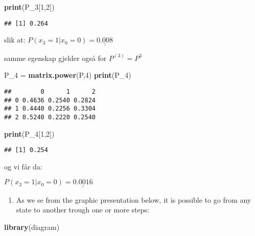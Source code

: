 \documentclass[]{article}
\newenvironment{Shaded}{\begin{snugshade}}{\end{snugshade}}
\newcommand{\DecValTok}[1]{\textcolor[rgb]{0.00,0.00,0.81}{#1}}
\newcommand{\KeywordTok}[1]{\textcolor[rgb]{0.13,0.29,0.53}{\textbf{#1}}}
\newcommand{\NormalTok}[1]{#1}
\newcommand{\StringTok}[1]{\textcolor[rgb]{0.31,0.60,0.02}{#1}}
\providecommand{\tightlist}{%
  \setlength{\itemsep}{0pt}\setlength{\parskip}{0pt}}
\begin{document}
\begin{Shaded}
\begin{Highlighting}[]
\KeywordTok{print}\NormalTok{(P_}\DecValTok{3}\NormalTok{[}\DecValTok{1}\NormalTok{,}\DecValTok{2}\NormalTok{])}
\end{Highlighting}
\end{Shaded}

\begin{verbatim}
## [1] 0.264
\end{verbatim}

slik at: \(P(x_{3}=1|x_{0}=0) = \underline{\underline{0.008}}\)

samme egenskap gjelder også for \(P^{(3)}=P^{3}\)

\begin{Shaded}
\begin{Highlighting}[]
\NormalTok{P_}\DecValTok{4}\NormalTok{ =}\StringTok{ }\KeywordTok{matrix.power}\NormalTok{(P,}\DecValTok{4}\NormalTok{)}
\KeywordTok{print}\NormalTok{(P_}\DecValTok{4}\NormalTok{)}
\end{Highlighting}
\end{Shaded}

\begin{verbatim}
##        0      1      2
## 0 0.4636 0.2540 0.2824
## 1 0.4440 0.2256 0.3304
## 2 0.5240 0.2220 0.2540
\end{verbatim}

\begin{Shaded}
\begin{Highlighting}[]
\KeywordTok{print}\NormalTok{(P_}\DecValTok{4}\NormalTok{[}\DecValTok{1}\NormalTok{,}\DecValTok{2}\NormalTok{])}
\end{Highlighting}
\end{Shaded}

\begin{verbatim}
## [1] 0.254
\end{verbatim}

og vi får da:

\(P(x_{3}=1|x_{0}=0) = \underline{\underline{0.0016}}\)

\begin{enumerate}
\def\labelenumi{\alph{enumi})}
\setcounter{enumi}{1}
\tightlist
\item
  As we se from the graphic presentation below, it is possible to go
  from any state to another trough one or more steps:
\end{enumerate}

\begin{Shaded}
\begin{Highlighting}[]
\KeywordTok{library}\NormalTok{(diagram)}
\end{Highlighting}
\end{Shaded}
\end{document}
